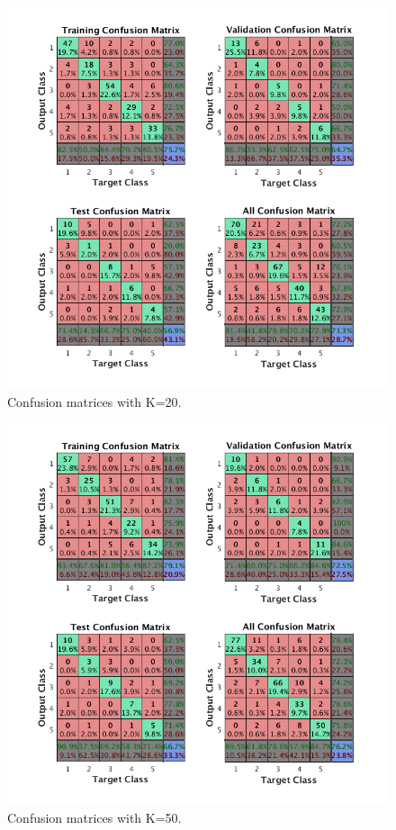 \documentclass{article}
\begin{document}
\begin{figure}[Ht]
\centering
\includegraphics[scale=0.5]{Figures/Metrics/conf_k20}
\caption{Confusion matrices with K=20.}
\label{fig:k20}
\end{figure}
\begin{figure}[Ht]
\centering
\includegraphics[scale=0.5]{Figures/Metrics/conf_k50}
\caption{Confusion matrices with K=50.}
\label{fig:k50}
\end{figure}
\end{document}
